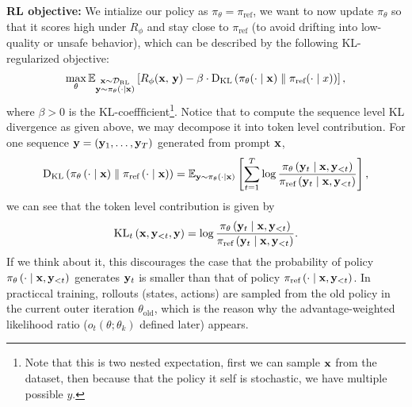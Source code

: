 \documentclass[11pt]{article}  %
\begin{document}
\textbf{RL objective:} We intialize our policy as $\pi_{\theta} = \pi_{\text{ref}}$, we want to now update $\pi_{\theta}$ so that it scores high under $R_{\phi}$ and stay close to $\pi_{\text{ref}}$ (to avoid drifting into low-quality or unsafe behavior), which can be described by the following KL-regularized objective:
\begin{align}
  \label{eq-obj-RL}
  \max_{\theta} \mathbb{E}_{\substack{\mathbf{x} \sim \mathcal{D}_{\text{RL}} \\ \mathbf{y} \sim \pi_{\theta}(\cdot \mid \mathbf{x})}}\left[R_{\phi}(\mathbf{x}, \,\mathbf{y}) - \beta \cdot {\rm D}_{\text{KL}}\left( \pi_{\theta}(\cdot \mid \mathbf{x}) \parallel \pi_{\text{ref}}(\cdot \mid x) \right)\right],
\end{align}
where $\beta > 0$ is the KL-coeffficient\footnote{Note that this is two nested expectation, first we can sample $\mathbf{x}$ from the dataset, then because that the policy it self is stochastic, we have multiple possible $y$.}.
Notice that to compute the sequence level KL divergence as given above, we may decompose it into token level contribution.
For one sequence $\mathbf{y} = \left( \mathbf{y}_1, \hdots, \mathbf{y}_T \right)$ generated from prompt $\mathbf{x}$,
\begin{align*}
  {\rm D}_{\text{KL}}\left( \pi_{\theta}\left( \cdot \mid \mathbf{x} \right) \parallel \pi_{\text{ref}}\left( \cdot \mid \mathbf{x} \right) \right) = \mathbb{E}_{\mathbf{y} \sim \pi_{\theta}\left( \cdot \mid \mathbf{x} \right)}\left[\sum_{t=1}^{T}\log \frac{\pi_{\theta}\left( \mathbf{y}_t \mid \mathbf{x}, \mathbf{y}_{<t} \right)}{\pi_{\text{ref}}\left( \mathbf{y}_t \mid \mathbf{x}, \mathbf{y}_{<t} \right)}\right],
\end{align*}
we can see that the token level contribution is given by 
\begin{align*}
  \text{KL}_t \left( \mathbf{x}, \mathbf{y}_{<t}, \mathbf{y} \right) = \log \frac{\pi_{\theta}\left( \mathbf{y}_t \mid \mathbf{x}, \mathbf{y}_{<t} \right)}{\pi_{\text{ref}}\left( \mathbf{y}_t \mid \mathbf{x}, \mathbf{y}_{<t} \right)}.
\end{align*}
If we think about it, this discourages the case that the probability of policy $\pi_{\theta}\left( \cdot \mid \mathbf{x}, \mathbf{y}_{<t} \right)$ generates $\mathbf{y}_t$ is smaller than that of policy $\pi_{\text{ref}}\left( \cdot \mid \mathbf{x}, \mathbf{y}_{<t} \right)$.
In practiccal training, rollouts (states, actions) are sampled from the old policy in the current outer iteration $\theta_{\text{old}}$, which is the reason why the advantage-weighted likelihood ratio ($o_t(\theta; \theta_k)$ defined later) appears.
\end{document}
